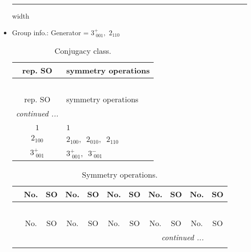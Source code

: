 \documentclass[fleqn,10pt,landscape]{article}
\begin{document}
\begin{itemize}
 \hfil \hrule height 1mm width \textwidth \hfil

\item Group info.: Generator = $3^{+}_{\,\,001},\,\,2{}_{110}$

\begin{center}
\renewcommand{\arraystretch}{1.3}
\begin{longtable}{c|l}
\caption{Conjugacy class.}
 \\
 \hline \hline
rep. SO & symmetry operations \\ \hline \endfirsthead

\multicolumn{1}{l}{\tablename\ \thetable{}} \\
 \hline \hline
rep. SO & symmetry operations \\ \hline \endhead

 \hline \hline
\multicolumn{1}{r}{\footnotesize\it continued ...} \\ \endfoot

 \hline \hline
\multicolumn{1}{r}{} \\ \endlastfoot

$1$ & $1$ \\ \hline
$2{}_{100}$ & $2{}_{100}$,\,\, $2{}_{010}$,\,\, $2{}_{110}$ \\ \hline
$3^{+}_{\,\,001}$ & $3^{+}_{\,\,001}$,\,\, $3^{-}_{\,\,001}$ \\
\end{longtable}
\end{center}
\begin{center}
\renewcommand{\arraystretch}{1.3}
\begin{longtable}{c|cc|cc|cc|cc|cc}
\caption{Symmetry operations.}
 \\
 \hline \hline
 & No. & SO & No. & SO & No. & SO & No. & SO & No. & SO \\ \hline \endfirsthead

\multicolumn{10}{l}{\tablename\ \thetable{}} \\
 \hline \hline
 & No. & SO & No. & SO & No. & SO & No. & SO & No. & SO \\ \hline \endhead

 \hline \hline
\multicolumn{10}{r}{\footnotesize\it continued ...} \\ \endfoot


\end{longtable}
\end{center}
\end{itemize}
\end{document}
